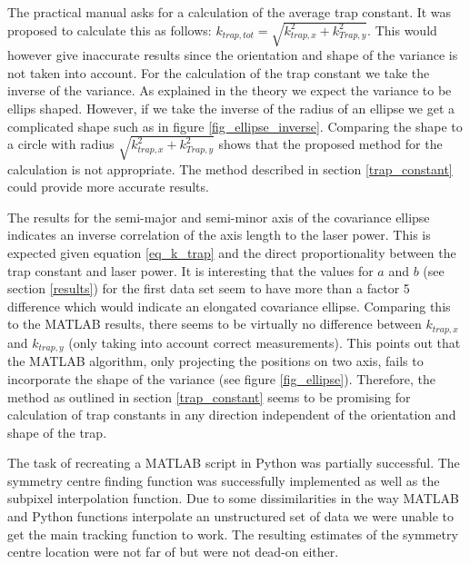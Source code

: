 The practical manual asks for a calculation of the average trap constant. It was proposed to calculate this as follows: $k_{trap,tot} = \sqrt{k_{trap,x}^2 + k_{Trap,y}^2}$. This would however give inaccurate results since the orientation and shape of the variance is not taken into account. For the calculation of the trap constant we take the inverse of the variance. As explained in the theory we expect the variance to be ellips shaped. However, if we take the inverse of the radius of an ellipse we get a complicated shape such as in figure \ref{fig_ellipse_inverse}. Comparing the shape to a circle with radius $\sqrt{k_{trap,x}^2 + k_{Trap,y}^2}$ shows that the proposed method for the calculation is not appropriate. The method described in section \ref{trap_constant} could provide more accurate results. 

The results for the semi-major and semi-minor axis of the covariance ellipse indicates an inverse correlation of the axis length to the laser power. This is expected given equation \ref{eq_k_trap} and the direct proportionality between the trap constant and laser power. It is interesting that the values for $a$ and $b$ (see section \ref{results}) for the first data set seem to have more than a factor 5 difference which would indicate an elongated covariance ellipse. Comparing this to the MATLAB results, there seems to be virtually no difference between $k_{trap,x}$ and $k_{trap,y}$ (only taking into account correct measurements). This points out that the MATLAB algorithm, only projecting the positions on two axis, fails to incorporate the shape of the variance (see figure \ref{fig_ellipse}). Therefore, the method as outlined in section \ref{trap_constant} seems to be promising for calculation of trap constants in any direction independent of the orientation and shape of the trap. 

The task of recreating a MATLAB script in Python was partially successful. The symmetry centre finding function was successfully implemented as well as the subpixel interpolation function. Due to some dissimilarities in the way MATLAB and Python functions interpolate an unstructured set of data we were unable to get the main tracking function to work. The resulting estimates of the symmetry centre location were not far of but were not dead-on either. 

